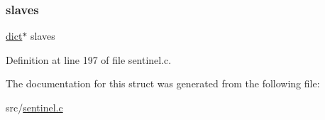 \subsubsection{\texorpdfstring{slaves}{slaves}}
{\footnotesize\ttfamily \hyperlink{structdict}{dict}$\ast$ slaves}



Definition at line 197 of file sentinel.\+c.



The documentation for this struct was generated from the following file\+:\begin{DoxyCompactItemize}
\item 
src/\hyperlink{sentinel_8c}{sentinel.\+c}\end{DoxyCompactItemize}
